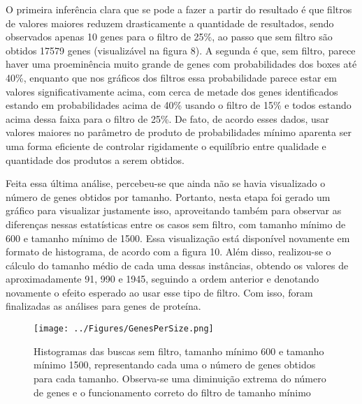 \documentclass[brazilian,12pt,a4paper,final]{article}
\begin{document}
	\vspace{0.5cm}
	
	O primeira inferência clara que se pode a fazer a partir do resultado é que filtros de valores maiores reduzem drasticamente a quantidade de resultados, sendo observados apenas 10 genes para o filtro de 25\%, ao passo que sem filtro são obtidos 17579 genes (visualizável na figura 8). A segunda é que, sem filtro, parece haver uma proeminência muito grande de genes com probabilidades dos boxes até 40\%, enquanto que nos gráficos dos filtros essa probabilidade parece estar em valores significativamente acima, com cerca de metade dos genes identificados estando em probabilidades acima de 40\% usando o filtro de 15\% e todos estando acima dessa faixa para o filtro de 25\%. De fato, de acordo esses dados, usar valores maiores no parâmetro de produto de probabilidades mínimo aparenta ser uma forma eficiente de controlar rigidamente o equilíbrio entre qualidade e quantidade dos produtos a serem obtidos.
	
	\vspace{0.5cm}
	
	Feita essa última análise, percebeu-se que ainda não se havia visualizado o número de genes obtidos por tamanho. Portanto, nesta etapa foi gerado um gráfico para visualizar justamente isso, aproveitando também para observar as diferenças nessas estatísticas entre os casos sem filtro, com tamanho mínimo de 600 e tamanho mínimo de 1500. Essa visualização está disponível novamente em formato de histograma, de acordo com a figura 10. Além disso, realizou-se o cálculo do tamanho médio de cada uma dessas instâncias, obtendo os valores de aproximadamente 91, 990 e 1945, seguindo a ordem anterior e denotando novamente o efeito esperado ao usar esse tipo de filtro. Com isso, foram finalizadas as análises para genes de proteína.
	
	\begin{figure}[hbtp]
		\begin{center}
			\texttt{[image: ../Figures/GenesPerSize.png]}
			\caption{Histogramas das buscas sem filtro, tamanho mínimo 600 e tamanho mínimo 1500, representando cada uma o número de genes obtidos para cada tamanho. Observa-se uma diminuição extrema do número de genes e o funcionamento correto do filtro de tamanho mínimo}
			\label{fig}
		\end{center}
	\end{figure}
	
	\vspace{0.5cm}
	
\end{document}
